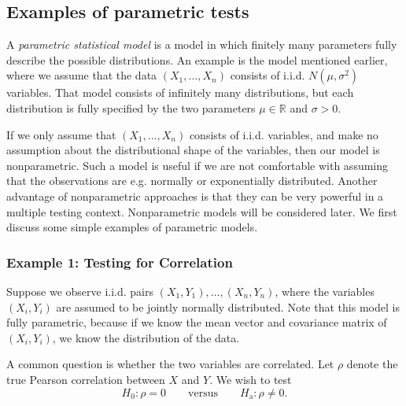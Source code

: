 \documentclass[11pt]{article}
\theoremstyle{plain}
\theoremstyle{definition}
\newcommand{\reals}{\mathbb{R}}
\newcommand{\Hy}{\mathcal{H}}
\begin{document}
\subsection{Examples of parametric tests}

A \emph{parametric statistical model} is a model in which finitely many parameters fully describe the possible distributions. An example is the model mentioned earlier, where we assume that the data $(X_1,...,X_n)$ consists of i.i.d. $N(\mu,\sigma^2)$ variables. That model consists of infinitely many distributions, but each distribution is fully specified by the two parameters $\mu\in \reals$ and $\sigma>0$.

If we only assume that $(X_1,...,X_n)$ consists of i.i.d. variables, and make no assumption about the distributional shape of the variables, then our model is nonparametric. Such a model is useful if we are not comfortable with assuming that the observations are e.g. normally or exponentially distributed. Another advantage of nonparametric approaches is that they can be very powerful in a multiple testing context.  Nonparametric models will be considered later. We first discuss some simple examples of parametric models. 



\subsubsection{Example 1: Testing for Correlation} \label{secexcortest}

Suppose we observe i.i.d. pairs $(X_1,Y_1),\ldots,(X_n,Y_n)$, where the variables $(X_i,Y_i)$ are assumed to be jointly normally distributed. 
Note that this model is fully  parametric, because if we know the mean vector and covariance matrix of $(X_i,Y_i)$, we know the distribution of the data.

A common question is whether  the two variables are correlated.
Let $\rho$ denote the true Pearson  correlation between $X$ and $Y$. We wish to test
\[
H_0: \rho = 0
\qquad \text{versus} \qquad
H_{\text{a}}: \rho \neq 0.
\]


\end{document}
